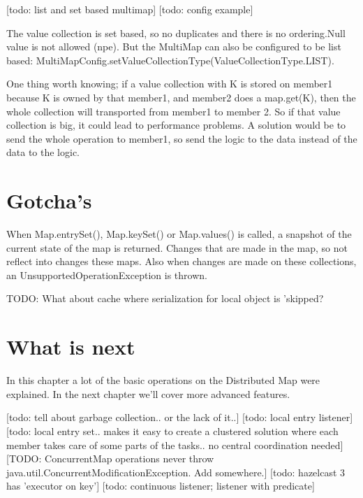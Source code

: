 [todo: list and set based multimap]
[todo: config example]

The value collection is set based, so no duplicates and there is no ordering.Null value is not allowed (npe). But the MultiMap can also be configured to be list based: MultiMapConfig.setValueCollectionType(ValueCollectionType.LIST). 

One thing worth knowing; if a value collection with K is stored on member1 because K is owned by that member1, and member2 does a map.get(K), then the whole collection will transported from member1 to member 2. So if that value collection is big, it could lead to performance problems. A solution would be to send the whole operation to member1, so send the logic to the data instead of the data to the logic.

\section{Gotcha's}
When Map.entrySet(), Map.keySet() or Map.values() is called, a snapshot of the current state of the map is returned. Changes that are made in the map, so not reflect into changes these maps. Also when changes are made on these collections, an UnsupportedOperationException is thrown.

TODO: What about cache where serialization for local object is 'skipped?

\section{What is next}
In this chapter a lot of the basic operations on the Distributed Map were explained. In the next chapter we'll cover more advanced features.

[todo: tell about garbage collection.. or the lack of it..]
[todo: local entry listener]
[todo: local entry set.. makes it easy to create a clustered solution where each member takes care of some parts of the tasks.. no central coordination needed]
[TODO: ConcurrentMap operations never throw java.util.ConcurrentModificationException. Add somewhere.]
[todo: hazelcast 3 has 'executor on key']
[todo: continuous listener; listener with predicate]


